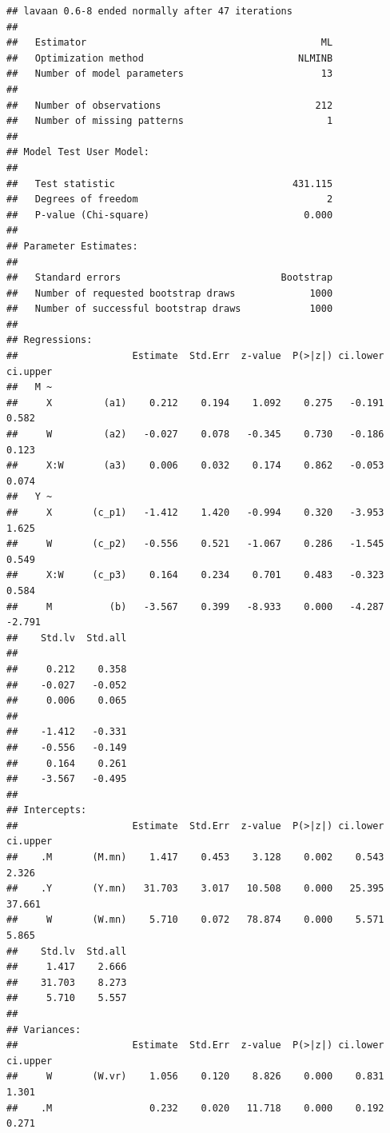 \documentclass[
  english,
]{book}
\begin{document}
\begin{verbatim}
## lavaan 0.6-8 ended normally after 47 iterations
## 
##   Estimator                                         ML
##   Optimization method                           NLMINB
##   Number of model parameters                        13
##                                                       
##   Number of observations                           212
##   Number of missing patterns                         1
##                                                       
## Model Test User Model:
##                                                       
##   Test statistic                               431.115
##   Degrees of freedom                                 2
##   P-value (Chi-square)                           0.000
## 
## Parameter Estimates:
## 
##   Standard errors                            Bootstrap
##   Number of requested bootstrap draws             1000
##   Number of successful bootstrap draws            1000
## 
## Regressions:
##                    Estimate  Std.Err  z-value  P(>|z|) ci.lower ci.upper
##   M ~                                                                   
##     X         (a1)    0.212    0.194    1.092    0.275   -0.191    0.582
##     W         (a2)   -0.027    0.078   -0.345    0.730   -0.186    0.123
##     X:W       (a3)    0.006    0.032    0.174    0.862   -0.053    0.074
##   Y ~                                                                   
##     X       (c_p1)   -1.412    1.420   -0.994    0.320   -3.953    1.625
##     W       (c_p2)   -0.556    0.521   -1.067    0.286   -1.545    0.549
##     X:W     (c_p3)    0.164    0.234    0.701    0.483   -0.323    0.584
##     M          (b)   -3.567    0.399   -8.933    0.000   -4.287   -2.791
##    Std.lv  Std.all
##                   
##     0.212    0.358
##    -0.027   -0.052
##     0.006    0.065
##                   
##    -1.412   -0.331
##    -0.556   -0.149
##     0.164    0.261
##    -3.567   -0.495
## 
## Intercepts:
##                    Estimate  Std.Err  z-value  P(>|z|) ci.lower ci.upper
##    .M       (M.mn)    1.417    0.453    3.128    0.002    0.543    2.326
##    .Y       (Y.mn)   31.703    3.017   10.508    0.000   25.395   37.661
##     W       (W.mn)    5.710    0.072   78.874    0.000    5.571    5.865
##    Std.lv  Std.all
##     1.417    2.666
##    31.703    8.273
##     5.710    5.557
## 
## Variances:
##                    Estimate  Std.Err  z-value  P(>|z|) ci.lower ci.upper
##     W       (W.vr)    1.056    0.120    8.826    0.000    0.831    1.301
##    .M                 0.232    0.020   11.718    0.000    0.192    0.271

\end{verbatim}
\end{document}
